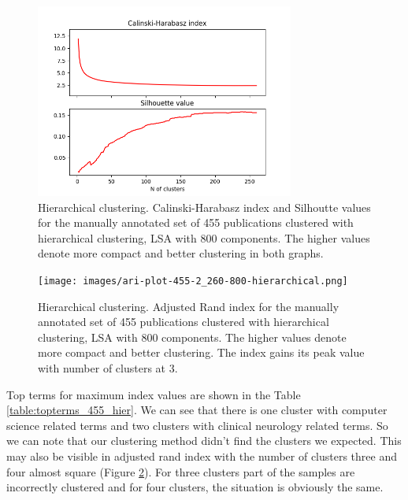\begin{figure}[ht]
  \begin{center}    
\includegraphics[width=8.5cm]{images/c-h-silh-index-plot-519-2_260-800-hierarchical.png}
    \caption{Hierarchical clustering. Calinski-Harabasz index and Silhoutte values for the
    manually annotated set of 455 publications clustered with hierarchical
    clustering, LSA with 800 components. The higher values denote 
    more compact and better clustering in both graphs.}
    \label{fig:ch-silh01}
    \end{center}
\end{figure}

\begin{figure}[htp]
  \begin{center}    
\texttt{[image: images/ari-plot-455-2\_260-800-hierarchical.png]}
    \caption{Hierarchical clustering. Adjusted Rand index for the
    manually annotated set of 455 publications clustered with hierarchical
    clustering, LSA with 800 components. The higher values denote 
    more compact and better clustering. The index gains its peak value with 
    number of clusters at $3$.}
    \label{fig:ari01}
  \end{center}
\end{figure}

Top terms for maximum index values are shown in the Table 
\ref{table:topterms_455_hier}. We can see that there is one cluster
with computer science related terms and two clusters with clinical
neurology related terms. So we can note that our clustering method
didn't find the clusters we expected. This may also be visible 
in adjusted rand index with the number of clusters three and four almost
square (Figure \ref{fig:ari01}). For three clusters part of the samples are incorrectly 
clustered and for four clusters, the situation is obviously the same.



